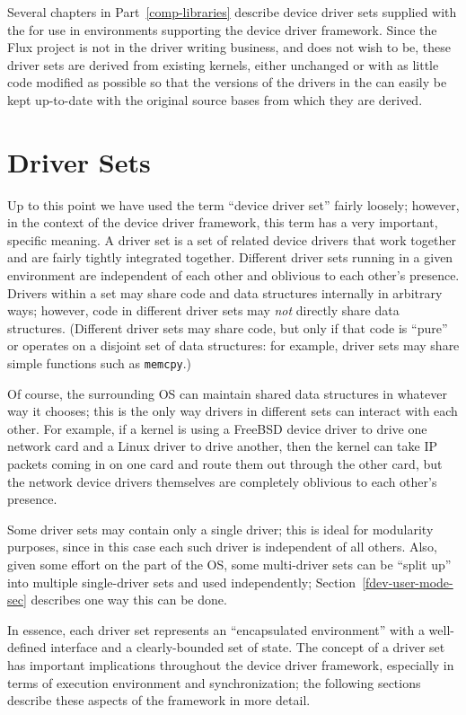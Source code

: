 Several chapters in Part~\ref{comp-libraries}
describe device driver sets supplied with the \oskit{}
for use in environments supporting the \oskit{} device driver framework.
Since the Flux project is not in the driver writing business,
and does not wish to be,
these driver sets are derived from existing kernels,
either unchanged or with as little code modified as possible
so that the versions of the drivers in the \oskit{}
can easily be kept up-to-date
with the original source bases from which they are derived.

\section{Driver Sets}

Up to this point we have used the term ``device driver set'' fairly loosely;
however, in the context of the \oskit{} device driver framework,
this term has a very important, specific meaning.
A driver set is a set of related device drivers
that work together and are fairly tightly integrated together.
Different driver sets running in a given environment
are independent of each other and oblivious to each other's presence.
Drivers within a set
may share code and data structures internally in arbitrary ways;
however, code in different driver sets
may \emph{not} directly share data structures.
(Different driver sets may share code,
but only if that code is ``pure''
or operates on a disjoint set of data structures:
for example, driver sets may share simple functions such as {\tt memcpy}.)

Of course, the surrounding OS can maintain shared data structures
in whatever way it chooses;
this is the only way drivers in different sets can interact with each other.
For example, if a kernel is using
a FreeBSD device driver to drive one network card
and a Linux driver to drive another,
then the kernel can take IP packets coming in on one card
and route them out through the other card,
but the network device drivers themselves
are completely oblivious to each other's presence.

Some driver sets may contain only a single driver;
this is ideal for modularity purposes,
since in this case each such driver is independent of all others.
Also, given some effort on the part of the OS,
some multi-driver sets can be ``split up''
into multiple single-driver sets and used independently;
Section~\ref{fdev-user-mode-sec} describes one way this can be done.

In essence, each driver set represents an ``encapsulated environment''
with a well-defined interface and a clearly-bounded set of state.
The concept of a driver set has important implications
throughout the device driver framework,
especially in terms of execution environment and synchronization;
the following sections describe these aspects of the framework
in more detail.

